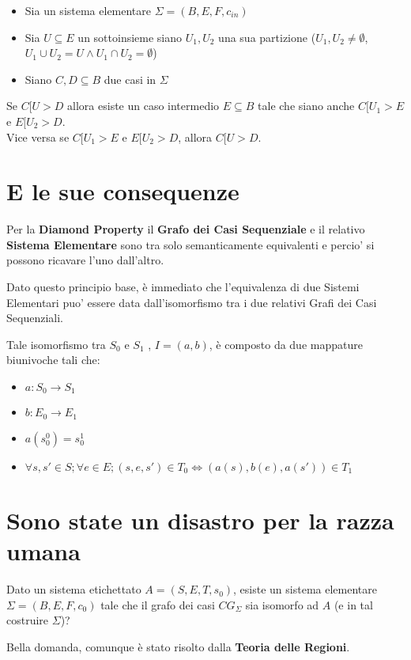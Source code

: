 \begin{itemize}
  \item Sia un sistema elementare $\Sigma = (B, E, F, c_{in})$
  \item Sia $U \subseteq E$ un sottoinsieme siano $U_1,U_2$ una sua partizione ($U_1,U_2 \neq \emptyset$, $U_1 \cup U_2 = U \land U_1 \cap U_2 = \emptyset$)
  \item Siano $C,D \subseteq B$ due casi in $\Sigma$
\end{itemize}

Se $C[U>D$ allora esiste un caso intermedio $E \subseteq B$ tale che siano anche $C[U_1>E$ e $E[U_2>D$. \\
Vice versa se $C[U_1>E$ e $E[U_2>D$, allora $C[U>D$.

\section{E le sue consequenze}

Per la \textbf{Diamond Property} il \textbf{Grafo dei Casi Sequenziale} e il relativo \textbf{Sistema Elementare} sono tra solo semanticamente equivalenti e percio' si possono ricavare l'uno dall'altro.

Dato questo principio base, \`e immediato che l'equivalenza di due Sistemi Elementari puo' essere data dall'isomorfismo tra i due relativi Grafi dei Casi Sequenziali.

Tale isomorfismo tra $S_0$ e $S_1$ , $I = (a, b)$, \`e composto da due mappature biunivoche tali che:
\begin{itemize}
  \item $a: S_0 \rightarrow S_1$
  \item $b : E_0 \rightarrow E_1$
  \item $a(s^0_0) = s^1_0$
  \item $\forall s,s' \in S; \forall e \in E; (s, e, s') \in T_0 \Leftrightarrow (a(s), b(e), a(s')) \in T_1$
\end{itemize}

\section{Sono state un disastro per la razza umana}

Dato un sistema etichettato $A = (S, E, T, s_0)$, esiste un sistema elementare $\Sigma = (B, E, F, c_0)$ tale che il grafo dei casi $CG_\Sigma$ sia isomorfo ad $A$ (e in tal costruire $\Sigma$)?

Bella domanda, comunque \`e stato risolto dalla \textbf{Teoria delle Regioni}.

